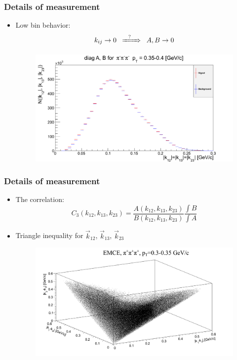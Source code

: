 \documentclass{beamer}
\begin{document}
\begin{frame}
\frametitle{Details of measurement}
\begin{itemize}
\setlength{\itemsep}{16pt}
\item Low bin behavior:
\begin{equation}
k_{ij}\rightarrow 0 \;\;\xRightarrow{\;\;\;?\;\;\;\;}\;\; A,B\rightarrow 0
\end{equation}
\begin{figure}
\includegraphics[scale=0.25]{pic/AB2}
\end{figure}
\end{itemize}
\end{frame}

\begin{frame}
\frametitle{Details of measurement}
\begin{itemize}
\setlength{\itemsep}{16pt}
\item The correlation:
\begin{equation}
C_3(k_{12}, k_{13}, k_{23})=\frac{A(k_{12}, k_{13}, k_{23})}{B(k_{12}, k_{13}, k_{23})}\frac{\int B}{\int A}
\end{equation}
\item Triangle inequality for $\vec{k}_{12}$, $\vec{k}_{13}$, $\vec{k}_{23}$
\begin{figure}
\includegraphics[scale=0.25]{pic/C1}
\end{figure}
\end{itemize}
\end{frame}
\end{document}
